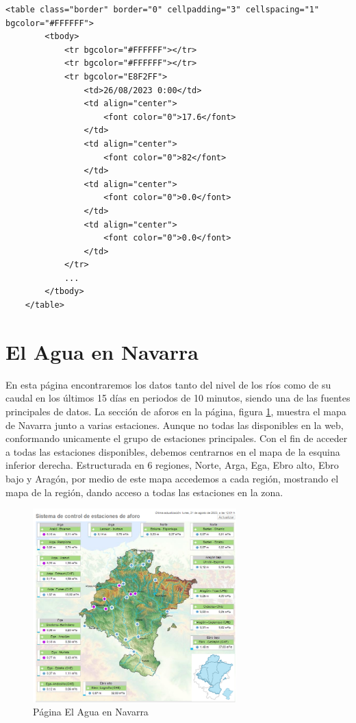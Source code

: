\begin{lstlisting}[basicstyle=\footnotesize, caption={HTML tabla datos en MeteoNavarra}]
	<table class="border" border="0" cellpadding="3" cellspacing="1" bgcolor="#FFFFFF">
		<tbody>
			<tr bgcolor="#FFFFFF"></tr>
			<tr bgcolor="#FFFFFF"></tr>
			<tr bgcolor="E8F2FF">
				<td>26/08/2023 0:00</td>
				<td align="center">
					<font color="0">17.6</font>
				</td>
				<td align="center">
					<font color="0">82</font>
				</td>
				<td align="center">
					<font color="0">0.0</font>
				</td>
				<td align="center">
					<font color="0">0.0</font>
				</td>
			</tr>
			...
		</tbody>
	</table>
\end{lstlisting}

\section{El Agua en Navarra}
En esta página encontraremos los datos tanto del nivel de los ríos como de su caudal en los últimos 15 días en periodos de 10 minutos, siendo una de las fuentes principales de datos.
\newline
\newline
La sección de aforos en la página, figura \ref{fig:ej4}, muestra el mapa de Navarra junto a varias estaciones. Aunque no todas las disponibles en la web, conformando unicamente el grupo de estaciones principales.\newline
\newline
Con el fin de acceder a todas las estaciones disponibles, debemos centrarnos en el mapa de la esquina inferior derecha. Estructurada en 6 regiones, Norte, Arga, Ega, Ebro alto, Ebro bajo y Aragón, por medio de este mapa accedemos a cada región, mostrando el mapa de la región, dando acceso a todas las estaciones en la zona.

\begin{figure} [H]
	\centering
	\includegraphics[width=0.7\textwidth]{fig/AguaEnNavarraCode.png}
	\caption[Página principal de aforos de El Agua en Navarra]{Página El Agua en Navarra}
	\label{fig:ej4}
\end{figure}

